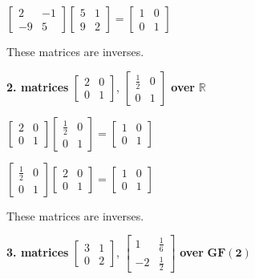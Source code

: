 \documentclass[
  letterpaper,
  DIV=11,
  numbers=noendperiod]{scrartcl}
\begin{document}
\(\begin{bmatrix}2 &-1\\-9 &5\end{bmatrix} \begin{bmatrix}5 &1\\9 &2\end{bmatrix} = \begin{bmatrix}1 &0\\0 &1\end{bmatrix}\)

These matrices are inverses.

\textbf{2. matrices} \(\begin{bmatrix} 2 & 0 \\ 0 & 1 \end{bmatrix}\),
\(\begin{bmatrix} \frac{1}{2} & 0 \\ 0 & 1 \end{bmatrix}\) \textbf{over}
\(\bm{\mathbb{R}}\)

\(\begin{bmatrix}2 &0\\0 &1\end{bmatrix} \begin{bmatrix}\frac{1}{2} &0\\0 &1\end{bmatrix} = \begin{bmatrix}1 &0\\0 &1\end{bmatrix}\)

\(\begin{bmatrix}\frac{1}{2} &0\\0 &1\end{bmatrix} \begin{bmatrix}2 &0\\0 &1\end{bmatrix} = \begin{bmatrix}1 &0\\0 &1\end{bmatrix}\)

These matrices are inverses.

\textbf{3. matrices} \(\begin{bmatrix} 3 & 1 \\ 0 & 2 \end{bmatrix}\),
\(\begin{bmatrix} 1 & \frac{1}{6} \\ -2 & \frac{1}{2} \end{bmatrix}\)
\textbf{over} \(\bm{GF(2)}\)
\end{document}
